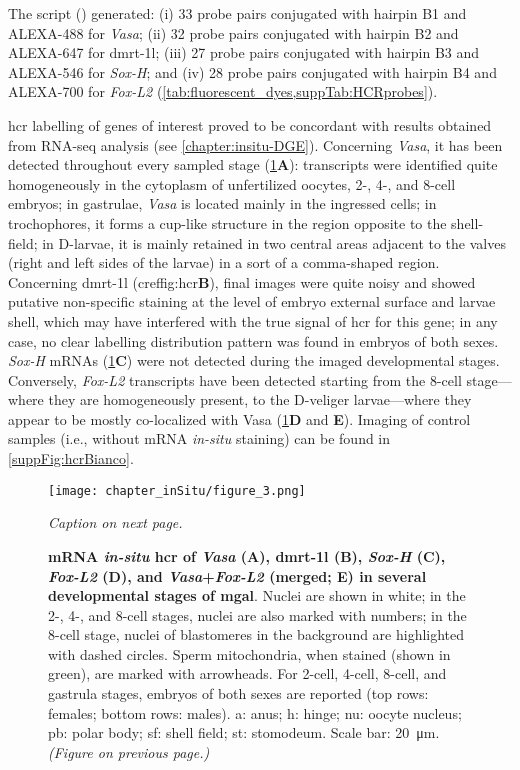The  script () generated: (i) 33 probe pairs conjugated with hairpin B1 and ALEXA-488 for \textit{Vasa}; (ii) 32 probe pairs conjugated with hairpin B2 and ALEXA-647 for \gls{dmrt-1l}; (iii) 27 probe pairs conjugated with hairpin B3 and ALEXA-546 for \textit{Sox-H}; and (iv) 28 probe pairs conjugated with hairpin B4 and ALEXA-700 for \textit{Fox-L2} (\cref{tab:fluorescent_dyes,suppTab:HCRprobes}).

\gls{hcr} labelling of genes of interest proved to be concordant with results obtained from RNA-seq analysis (see \cref{chapter:insitu-DGE}). Concerning \textit{Vasa}, it has been detected throughout every sampled stage (\cref{fig:hcr}\textbf{A}): transcripts were identified quite homogeneously in the cytoplasm of unfertilized oocytes, 2-, 4-, and 8-cell embryos; in gastrulae, \textit{Vasa} is located mainly in the ingressed cells; in trochophores, it forms a cup-like structure in the region opposite to the shell-field; in D-larvae, it is mainly retained in two central areas adjacent to the valves (right and left sides of the larvae) in a sort of a comma-shaped region. Concerning \gls{dmrt-1l} (cref{fig:hcr}\textbf{B}), final images were quite noisy and showed putative non-specific staining at the level of embryo external surface and larvae shell, which may have interfered with the true signal of \gls{hcr} for this gene; in any case, no clear labelling distribution pattern was found in embryos of both sexes. \textit{Sox-H} mRNAs (\cref{fig:hcr}\textbf{C}) were not detected during the imaged developmental stages. Conversely, \textit{Fox-L2} transcripts have been detected starting from the 8-cell stage—where they are homogeneously present, to the D-veliger larvae—where they appear to be mostly co-localized with Vasa (\cref{fig:hcr}\textbf{D} and \textbf{E}). Imaging of control samples (i.e., without mRNA \textit{in-situ} staining) can be found in \cref{suppFig:hcrBianco}.

\begin{figure}
    \centering
    \texttt{[image: chapter\_inSitu/figure\_3.png]}
    \caption{\textit{Caption on next page.}}
    \label{fig:hcr}
\end{figure}

\begingroup
\captionsetup[figure]{format=hruleformat}
\begin{figure}\ContinuedFloat
    \caption[]
	{
		\textbf{mRNA \textit{in-situ} \gls{hcr} of \textit{Vasa} (A), \gls{dmrt-1l} (B), \textit{Sox-H} (C), \textit{Fox-L2} (D), and \textit{Vasa}+\textit{Fox-L2} (merged; E) in several developmental stages of \gls{mgal}}. Nuclei are shown in white; in the 2-, 4-, and 8-cell stages, nuclei are also marked with numbers; in the 8-cell stage, nuclei of blastomeres in the background are highlighted with dashed circles. Sperm mitochondria, when stained (shown in green), are marked with arrowheads. For 2-cell, 4-cell, 8-cell, and gastrula stages, embryos of both sexes are reported (top rows: females; bottom rows: males). a: anus; h: hinge; nu: oocyte nucleus; pb: polar body; sf: shell field; st: stomodeum. Scale bar: \qty{20}{\um}. \textit{(Figure on previous page.)}
	}
\end{figure}
\endgroup

